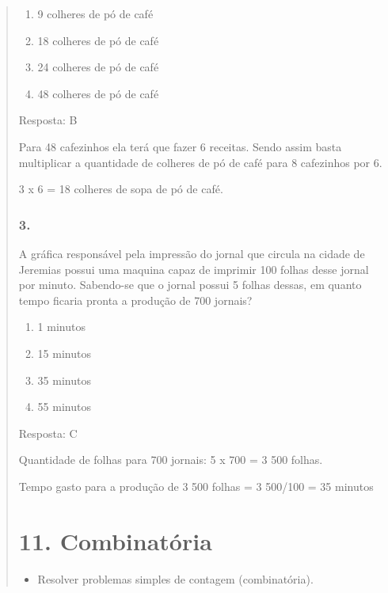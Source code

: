 \begin{enumerate}
\begin{escolha}
\begin{enumerate}
\begin{itemize}
\begin{itemize}
\begin{escolha}
\begin{quote}
\begin{escolha}
{\begin{enumerate}
\def\labelenumi{\alph{enumi})}
\item
  9 colheres de pó de café
\item
  18 colheres de pó de café
\item
  24 colheres de pó de café
\item
  48 colheres de pó de café
\end{enumerate}

Resposta: B

Para 48 cafezinhos ela terá que fazer 6 receitas. Sendo assim basta
multiplicar a quantidade de colheres de pó de café para 8 cafezinhos por
6.

3 x 6 = 18 colheres de sopa de pó de café.

\subsubsection{3.}\label{section-129}

A gráfica responsável pela impressão do jornal que circula na cidade de
Jeremias possui uma maquina capaz de imprimir 100 folhas desse jornal
por minuto. Sabendo-se que o jornal possui 5 folhas dessas, em quanto
tempo ficaria pronta a produção de 700 jornais?

\begin{enumerate}
\def\labelenumi{\alph{enumi})}
\item
  1 minutos
\item
  15 minutos
\item
  35 minutos
\item
  55 minutos
\end{enumerate}

Resposta: C

Quantidade de folhas para 700 jornais: 5 x 700 = 3 500 folhas.

Tempo gasto para a produção de 3 500 folhas = 3 500/100 = 35 minutos

\section{11. Combinatória}\label{muxf3dulo-11}


\begin{itemize}
\item Resolver problemas simples de contagem (combinatória).
\end{itemize}

}
\end{escolha}
\end{quote}
\end{escolha}
\end{itemize}
\end{itemize}
\end{enumerate}
\end{escolha}
\end{enumerate}
